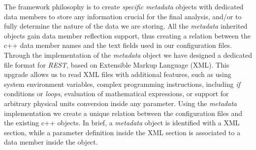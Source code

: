 The framework philosophy is to create \emph{specific metadata} objects with dedicated data members to store any information crucial for the final analysis, and/or to fully determine the nature of the data we are storing. All the \emph{metadata} inherited objects gain data member reflection support, thus creating a relation between the c++ data member names and the text fields used in our configuration files. Through the implementation of the \emph{metadata} object we have designed a dedicated file format for \emph{REST}, based on Extensible Markup Language (XML). This upgrade allows us to read XML files with additional features, such as using system environment variables, complex programming instructions, including \emph{if} conditions or \emph{loops}, evaluation of mathematical expressions, or support for arbitrary physical units conversion inside any parameter.
Using the \emph{metadata} implementation we create a unique relation between the configuration files and the existing c++ objects. In brief, a \emph{metadata} object is identified with a XML section, while a parameter definition inside the XML section is associated to a data member inside the object. 










